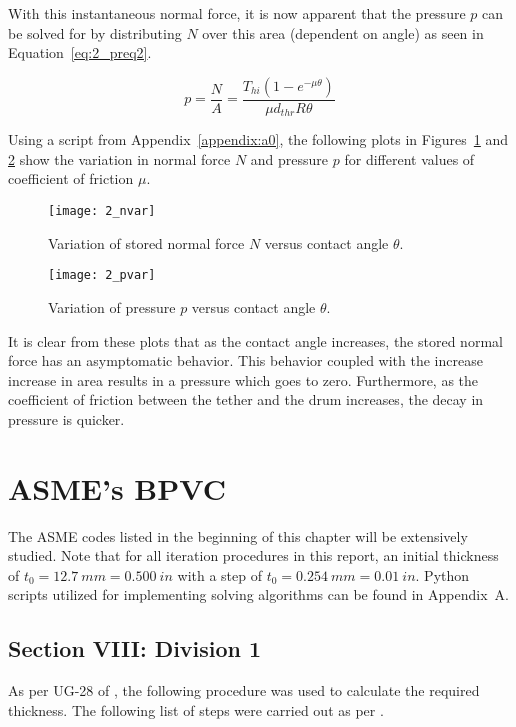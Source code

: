 With this instantaneous normal force, it is now apparent that the pressure $p$ can be solved for by distributing $N$ over this area (dependent on angle) as seen in Equation~\ref{eq:2_preq2}.

\begin{equation}
	\label{eq:2_preq2}
	p=\frac{N}{A}= \frac{T_{hi} \left( 1 - e^{-\mu \theta} \right)}{\mu d_{thr} R \theta}
\end{equation}

Using a script from Appendix~\ref{appendix:a0}, the following plots in Figures~\ref{fig:2_nvar} and \ref{fig:2_pvar} show the variation in normal force $N$ and pressure $p$ for different values of coefficient of friction $\mu$.

\begin{figure}[H]
	\centering
	\texttt{[image: 2\_nvar]}
	\caption{Variation of stored normal force $N$ versus contact angle $\theta$.}
	\label{fig:2_nvar}
\end{figure}

\begin{figure}[H]
	\centering
	\texttt{[image: 2\_pvar]}
	\caption{Variation of pressure $p$ versus contact angle $\theta$.}
	\label{fig:2_pvar}
\end{figure}

It is clear from these plots that as the contact angle increases, the stored normal force has an asymptomatic behavior. This behavior coupled with the increase increase in area results in a pressure which goes to zero. Furthermore, as the coefficient of friction between the tether and the drum increases, the decay in pressure is quicker.  

\section{ASME's BPVC}

The ASME codes listed in the beginning of this chapter will be extensively studied. Note that for all iteration procedures in this report, an initial thickness of $t_0 = 12.7\ mm=0.500\ in$ with a step of $t_0 = 0.254\ mm=0.01\ in$. Python scripts utilized for implementing solving algorithms can be found in Appendix~A.
\subsection{Section VIII: Division 1}
As per UG-28 of \citep{ASMEbvpcVII1}, the following procedure was used to calculate the required thickness.
The following list of steps were carried out as per \citep{ASMEbvpcVII1}.

